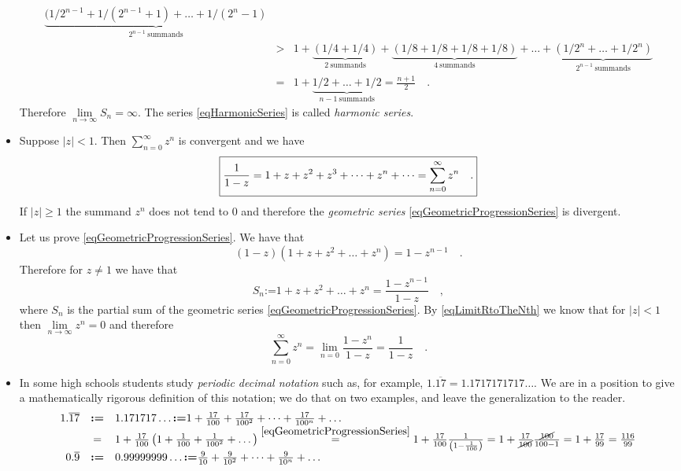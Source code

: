 \documentclass[12pt]{book}
\newcommand{\eqdef}{\textbf{:=}}
\newcommand{\importantFormula}[1]{\begin{equation} \boxed{#1} \end{equation}}
\begin{document}
\begin{itemize}
\begin{equation*}
\begin{array}{rcl}
\underbrace{(1/2^{n-1}+1/(2^{n-1}+1)+\dots +1/(2^{n}-1)}_{2^{n-1}\mathrm{~summands}}\\
&>& 1+ \underbrace{\left(1/4+1/4\right)}_{\mathrm{2~summands}} +\underbrace{(1/8+1/8+1/8+1/8)}_{\mathrm{4~summands}}+\dots +
\underbrace{(1/2^{n}+\dots +1/2^{n})}_{2^{n-1}\mathrm{~summands}}\\
&=&1+\underbrace{  1/2+\dots +1/2}_{n-1\mathrm{~summands}}= \frac{n+1}2\quad . 
\end{array}
\end{equation*}
Therefore $\lim\limits_{n\to \infty} S_{n}=\infty $. The series \eqref{eqHarmonicSeries} is called \emph{harmonic series}.
\item Suppose $|z|<1$. Then $\sum_{n=0}^{\infty} z^n$ is convergent and we have
\importantFormula{
\label{eqGeometricProgressionSeries}
\frac{1}{1-z}=1+z+z^2+z^3+\dots +z^n+\dots= \sum_{n=0}^{\infty} z^n\quad.
}
If $|z|\geq 1$ the summand $z^n$ does not tend to $0$ and therefore the \emph{geometric series} \eqref{eqGeometricProgressionSeries} is divergent. 
\item Let us prove \eqref{eqGeometricProgressionSeries}. We have that 
\[(1-z)(1+z+z^2+\dots +z^{n})= 1- z^{n-1}\quad .
\]
Therefore for $z\neq 1$ we have that 
\[
S_n\eqdef 1+z+z^2+\dots +z^n=\frac{1-z^{n-1}}{1-z}\quad ,
\]
where $S_n$ is the partial sum of the geometric series \eqref{eqGeometricProgressionSeries}. By \eqref{eqLimitRtoTheNth} we know that for $|z|<1$ then $\lim\limits_{n\to \infty} z^n=0$ and therefore 
\[
\sum_{n=0}^{\infty}z^n=\lim\limits_{n=0} \frac{1-z^n}{1-z}= \frac{1}{1-z} \quad.
\]
\item In some high schools students study \emph{periodic decimal notation} such as, for example, $1.\overline{17}= 1.1717171717\dots$. We are in a position to give a mathematically rigorous definition of this notation; we do that on two examples, and leave the generalization to the reader.
\[
\begin{array}{rcl}
1.\overline{17}&\eqdef&  1.171717\dots\eqdef 1+ \frac{17}{100}+ \frac{17}{100^2}+\dots +\frac{17}{100^n}+\dots\\
&=&1+\frac{17}{100}\left(1+\frac{1}{100}+\frac{1}{100^2}+\dots \right)\stackrel{\eqref{eqGeometricProgressionSeries}}{=} 1+\frac{17}{100}\frac{1}{\left(1-\frac{1}{100}\right)}=1+\frac{17}{\cancel{100}}\frac{\cancel{100}}{100-1}= 1+\frac{17}{99}= \frac{116}{99}\\
0.\overline{9}&\eqdef&  0.99999999\dots \eqdef \frac{9}{10}+ \frac{9}{10^2}+\dots +\frac{9}{10^n}+\dots\\

\end{array}\]
\end{itemize}
\end{document}

